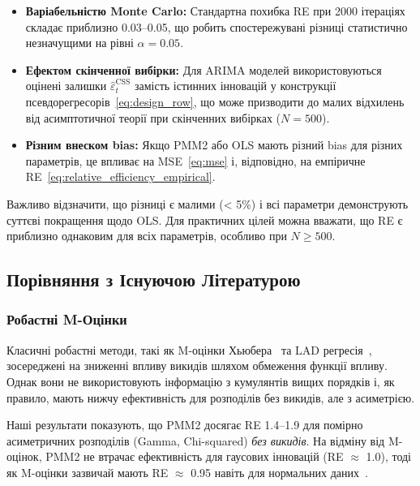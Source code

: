 \documentclass[12pt,a4paper]{article}
\begin{document}
\begin{itemize}
    \item \textbf{Варіабельністю Monte Carlo:} Стандартна похибка RE при 2000 ітераціях складає приблизно 0.03--0.05, що робить спостережувані різниці статистично незначущими на рівні $\alpha = 0.05$.

    \item \textbf{Ефектом скінченної вибірки:} Для ARIMA моделей використовуються оцінені залишки $\hat{\varepsilon}_t^{\text{CSS}}$ замість істинних інновацій у конструкції псевдорегресорів~\eqref{eq:design_row}, що може призводити до малих відхилень від асимптотичної теорії при скінченних вибірках ($N = 500$).

    \item \textbf{Різним внеском bias:} Якщо PMM2 або OLS мають різний bias для різних параметрів, це впливає на MSE~\eqref{eq:mse} і, відповідно, на емпіричне RE~\eqref{eq:relative_efficiency_empirical}.
\end{itemize}

Важливо відзначити, що різниці є малими (< 5\%) і всі параметри демонструють суттєві покращення щодо OLS. Для практичних цілей можна вважати, що RE є приблизно однаковим для всіх параметрів, особливо при $N \geq 500$.

\subsection{Порівняння з Існуючою Літературою}
\label{subsec:literature_comparison}

\subsubsection{Робастні M-Оцінки}

Класичні робастні методи, такі як M-оцінки Хьюбера~\cite{huber1964robust} та LAD регресія~\cite{koenker1978regression}, зосереджені на зниженні впливу викидів шляхом обмеження функції впливу. Однак вони не використовують інформацію з кумулянтів вищих порядків і, як правило, мають нижчу ефективність для розподілів без викидів, але з асиметрією.

Наші результати показують, що PMM2 досягає RE 1.4--1.9 для помірно асиметричних розподілів (Gamma, Chi-squared) \textit{без викидів}. На відміну від M-оцінок, PMM2 не втрачає ефективність для гаусових інновацій (RE $\approx$ 1.0), тоді як M-оцінки зазвичай мають RE $\approx$ 0.95 навіть для нормальних даних~\cite{hampel1986robust}.
\end{document}
